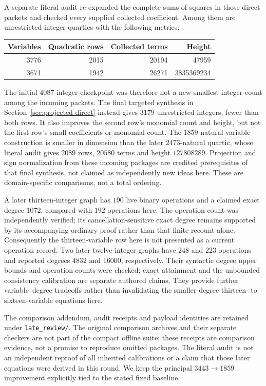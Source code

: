 \documentclass[11pt]{article}
\begin{document}
A separate literal audit re-expanded the complete sums of squares in
those direct packets and checked every supplied collected coefficient.
Among them are unrestricted-integer quartics with the following metrics:
\begin{center}
\begin{tabular}{rrrr}
\toprule
Variables & Quadratic rows & Collected terms & Height\\
\midrule
3776&2015&20194&47959\\
3671&1942&26271&3835369234\\
\bottomrule
\end{tabular}
\end{center}
The initial $4087$-integer checkpoint was therefore not a new smallest
integer count among the incoming packets. The final targeted synthesis in
Section~\ref{sec:projected-direct} instead gives $3179$ unrestricted
integers, fewer than both rows. It also improves the second row's
monomial count and height, but not the first row's small coefficients or
monomial count. The $1859$-natural-variable construction is smaller in
dimension than the later $2473$-natural quartic, whose literal audit gives
$2089$ rows, $20580$ terms and height $127808289$. Projection and sign
normalization from these incoming packages are credited prerequisites of
that final synthesis, not claimed as independently new ideas here.
These are domain-specific comparisons, not a total ordering.

A later thirteen-integer graph has $190$ live binary operations and a
claimed exact degree $1072$, compared with $192$ operations here. The
operation count was independently verified; its cancellation-sensitive
exact degree remains supported by its accompanying ordinary proof rather
than that finite recount alone. Consequently the thirteen-variable row
here is not presented as a current operation record.
Two later twelve-integer graphs have $248$ and $223$ operations and
reported degrees $4832$ and $16000$, respectively. Their syntactic degree
upper bounds and operation counts were checked; exact attainment and
the unbounded consistency calibration are separate authored claims.
They provide further variable--degree tradeoffs rather than invalidating
the smaller-degree thirteen- to sixteen-variable equations here.

The comparison addendum, audit receipts and payload identities are retained under
\texttt{late\_review/}. The original comparison archives and their separate checkers are not
part of the compact offline suite; these receipts are comparison evidence,
not a promise to reproduce omitted packages. The literal audit is not an
independent reproof of all inherited calibrations or a claim that those
later equations were derived in this round. We keep the principal
$3443\to1859$ improvement explicitly tied to the stated fixed baseline.
\end{document}
